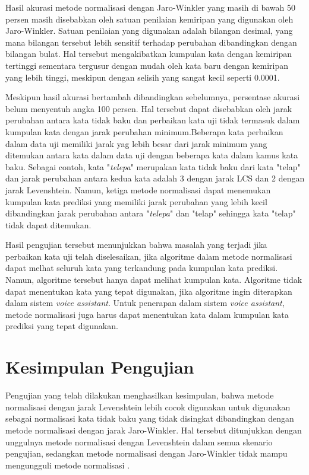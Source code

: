 Hasil akurasi metode normalisasi dengan Jaro-Winkler yang masih di bawah 50 persen masih disebabkan oleh satuan penilaian kemiripan yang digunakan oleh Jaro-Winkler. Satuan penilaian yang digunakan adalah bilangan desimal, yang mana bilangan tersebut lebih sensitif terhadap perubahan dibandingkan dengan bilangan bulat. Hal tersebut mengakibatkan kumpulan kata dengan kemiripan tertinggi sementara tergusur dengan mudah oleh kata baru dengan kemiripan yang lebih tinggi, meskipun dengan selisih yang sangat kecil seperti 0.0001.

Meskipun hasil akurasi bertambah dibandingkan sebelumnya, persentase akurasi belum menyentuh angka 100 persen. Hal tersebut dapat disebabkan oleh jarak perubahan antara kata tidak baku dan perbaikan kata uji tidak termasuk dalam kumpulan kata dengan jarak perubahan minimum.Beberapa kata perbaikan dalam data uji memiliki jarak yag lebih besar dari jarak minimum yang ditemukan antara kata dalam data uji dengan beberapa kata dalam kamus kata baku. Sebagai contoh, kata "\textit{telepa}" merupakan kata tidak baku dari kata "telap" dan jarak perubahan antara kedua kata adalah 3 dengan jarak LCS dan 2 dengan jarak Levenshtein. Namun, ketiga metode normalisasi dapat menemukan kumpulan kata prediksi yang memiliki jarak perubahan yang lebih kecil dibandingkan jarak perubahan antara "\textit{telepa}" dan "telap" sehingga kata "telap" tidak dapat ditemukan.

Hasil pengujian tersebut menunjukkan bahwa masalah yang terjadi jika perbaikan kata uji telah diselesaikan, jika algoritme dalam metode normalisasi dapat melhat seluruh kata yang terkandung pada kumpulan kata prediksi. Namun, algoritme tersebut hanya dapat melihat kumpulan kata. Algoritme tidak dapat menentukan kata yang tepat digunakan, jika algoritme ingin diterapkan dalam sistem \textit{voice assistant}. Untuk penerapan dalam sistem \textit{voice assistant}, metode normalisasi juga harus dapat menentukan kata dalam kumpulan kata prediksi yang tepat digunakan.

\section{Kesimpulan Pengujian}

Pengujian yang telah dilakukan menghasilkan kesimpulan, bahwa metode normalisasi dengan jarak Levenshtein lebih cocok digunakan untuk digunakan sebagai normalisasi kata tidak baku yang tidak disingkat dibandingkan dengan metode normalisasi dengan jarak Jaro-Winkler. Hal tersebut ditunjukkan dengan unggulnya metode normalisasi dengan Levenshtein dalam semua skenario pengujian, sedangkan metode normalisasi dengan Jaro-Winkler tidak mampu mengungguli metode normalisasi \parencite{saragih2017normalisasi}.